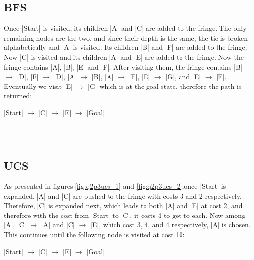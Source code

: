 \documentclass{homework}
\begin{document}
\subsection{BFS}
Once \cverb|Start| is visited, its children \cverb|A| and \cverb|C| are added to the fringe. The only remaining nodes are the two, and since their depth is the same, the tie is broken alphabetically and \cverb|A| is visited. Its children \cverb|B| and \cverb|F| are added to the fringe. Now \cverb|C| is visited and its children \cverb|A| and \cverb|E| are added to the fringe. Now the fringe contains \cverb|A|, \cverb|B|, \cverb|E| and \cverb|F|. After visiting them, the fringe contains \cverb|B| $\xrightarrow{}$ \cverb|D|, \cverb|F| $\xrightarrow{}$ \cverb|D|, \cverb|A| $\xrightarrow{}$ \cverb|B|, \cverb|A| $\xrightarrow{}$ \cverb|F|, \cverb|E| $\xrightarrow{}$ \cverb|G|, and \cverb|E| $\xrightarrow{}$ \cverb|F|. Eventually we visit \cverb|E| $\xrightarrow{}$ \cverb|G| which is at the goal state, therefore the path is returned:

\cverb|Start| $\xrightarrow{}$ \cverb|C| $\xrightarrow{}$ \cverb|E| $\xrightarrow{}$ \cverb|Goal|


\begin{figure}[h!]
    \centering
    \subfloat[Step 1]{}
    \qquad
    \subfloat[Step 2]{}\\
    \subfloat[Step 3]{}
    \qquad
    \subfloat[Step 4]{}\\
    \label{fig:q2p2bfs}
\end{figure}

\clearpage

\subsection{UCS}
As presented in figures \ref{fig:q2p3ucs_1} and \ref{fig:q2p3ucs_2},once \cverb|Start| is expanded, \cverb|A| and \cverb|C| are pushed to the fringe with costs 3 and 2 respectively. Therefore, \cverb|C| is expanded next, which leads to both \cverb|A| and \cverb|E| at cost 2, and therefore with the cost from \cverb|Start| to \cverb|C|, it costs 4 to get to each. Now among \cverb|A|, \cverb|C| $\xrightarrow{}$ \cverb|A| and \cverb|C| $\xrightarrow{}$ \cverb|E|, which cost 3, 4, and 4 respectively, \cverb|A| is chosen. This continues until the following node is visited at cost 10:

\cverb|Start| $\xrightarrow{}$ \cverb|C| $\xrightarrow{}$ \cverb|E| $\xrightarrow{}$ \cverb|Goal|
\end{document}

